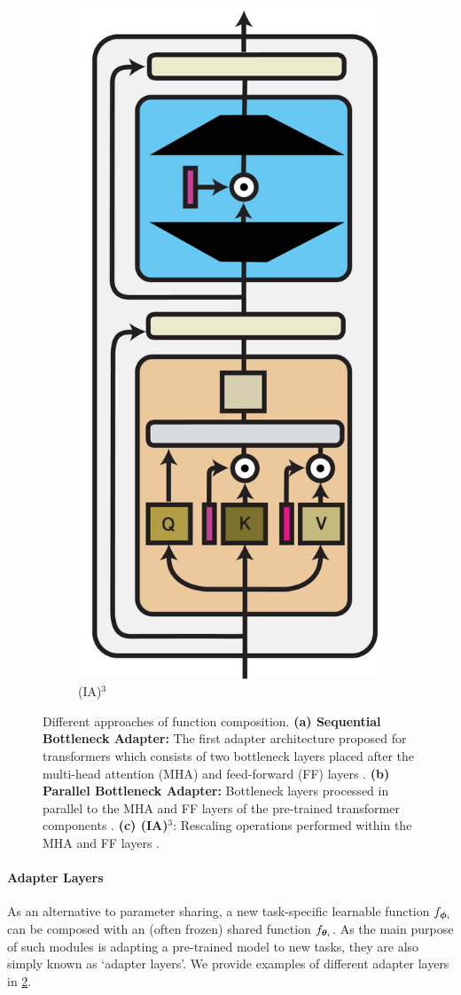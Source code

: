 \documentclass[10pt]{article} %
\begin{document}
\begin{figure}[t]
\begin{subfigure}[b]{.3\linewidth}
    \vspace{3em}
        \includegraphics[width=.4\linewidth]{img/IA3.pdf}  
        \vspace{0.5em}
        \caption{(IA)$^3$ }
        \label{fig:nature_modularity:ia3}
    \end{subfigure}
    \caption{ Different approaches of function composition. \textbf{(a) Sequential Bottleneck Adapter:} The first adapter architecture proposed for transformers which consists of two bottleneck layers placed after the multi-head attention (MHA) and feed-forward (FF) layers \citep{houlsby2019parameter}. \textbf{(b) Parallel Bottleneck Adapter:} Bottleneck layers processed in parallel to the MHA and FF layers of the pre-trained transformer components \citep{Rebuffi2018Adapters2,Stickland2019BERTPALs,He2021UnifiedAdapters}. \textbf{(c) (IA)$^3$}: Rescaling operations performed within the MHA and FF layers \citep{Liu2022IA3}.
    }
\label{fig:nature_modularity:adapter_examples}
\end{figure}

 

\paragraph*{Adapter Layers}
As an alternative to parameter sharing, a new task-specific learnable function $f_{{\bm{\phi}}_i}$ can be composed with an (often frozen) shared function $f_{{\bm{\theta}}_i}$. As the main purpose of such modules is adapting a pre-trained model to new tasks, they are also simply known as `adapter layers'. We provide examples of different adapter layers in \cref{fig:nature_modularity:adapter_examples}.
\end{document}
